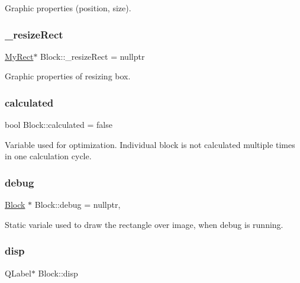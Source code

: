 Graphic properties (position, size). \mbox{\label{classBlock_ae7f260f0bdfd696d33b758a68de30d4c}} 
\subsubsection{\texorpdfstring{\+\_\+resize\+Rect}{\_resizeRect}}
{\footnotesize\ttfamily \hyperlink{classMyRect}{My\+Rect}$\ast$ Block\+::\+\_\+resize\+Rect = nullptr\hspace{0.3cm}{\ttfamily [private]}}

Graphic properties of resizing box. \mbox{\label{classBlock_a78ba2fc9a1343e5d9f6f372888e90bf2}} 
\subsubsection{\texorpdfstring{calculated}{calculated}}
{\footnotesize\ttfamily bool Block\+::calculated = false\hspace{0.3cm}{\ttfamily [private]}}

Variable used for optimization. Individual block is not calculated multiple times in one calculation cycle. \mbox{\label{classBlock_aad15dd9091823b114a17df309bd68bf4}} 
\subsubsection{\texorpdfstring{debug}{debug}}
{\footnotesize\ttfamily \hyperlink{classBlock}{Block} $\ast$ Block\+::debug = nullptr\hspace{0.3cm}{\ttfamily [static]}, {\ttfamily [private]}}

Static variale used to draw the rectangle over image, when debug is running. \mbox{\label{classBlock_a1d3b391e9531eb8bc0b0362730d4c53d}} 
\subsubsection{\texorpdfstring{disp}{disp}}
{\footnotesize\ttfamily Q\+Label$\ast$ Block\+::disp\hspace{0.3cm}{\ttfamily [private]}}

